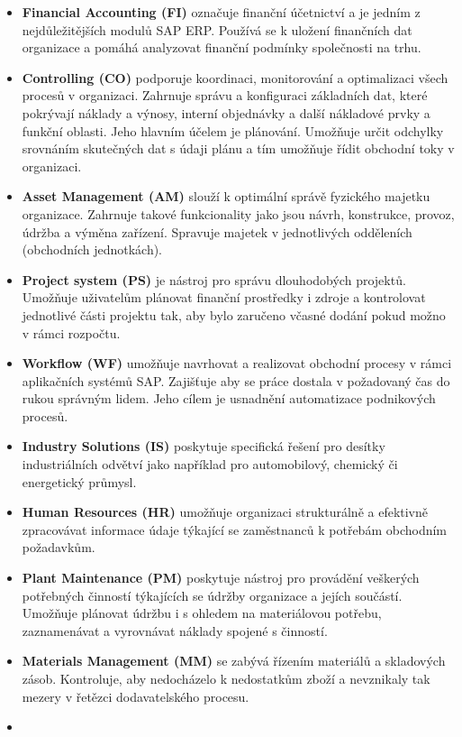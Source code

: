 \documentclass[thesis=M,czech]{FITthesis}[2012/06/26]
\begin{document}
\begin{itemize}
	\item
	\textbf{Financial Accounting (FI)} označuje finanční účetnictví a je jedním z nejdůležitějších modulů SAP ERP. Používá se k uložení finančních dat organizace a pomáhá analyzovat finanční podmínky společnosti na trhu.
	\item
	\textbf{Controlling (CO)} podporuje koordinaci, monitorování a optimalizaci všech procesů v organizaci. Zahrnuje správu a konfiguraci základních dat, které pokrývají náklady a výnosy, interní objednávky a další nákladové prvky a funkční oblasti. Jeho hlavním účelem je plánování. Umožňuje určit odchylky srovnáním skutečných dat s údaji plánu a tím umožňuje řídit obchodní toky v organizaci.
	\item
	\textbf{Asset Management (AM)} slouží k optimální správě fyzického majetku organizace. Zahrnuje takové funkcionality jako jsou návrh, konstrukce, provoz, údržba a výměna zařízení. Spravuje majetek v jednotlivých odděleních (obchodních jednotkách).
	\item
	\textbf{Project system (PS)} je nástroj pro správu dlouhodobých projektů. Umožňuje uživatelům plánovat finanční prostředky i zdroje a kontrolovat jednotlivé části projektu tak, aby bylo zaručeno včasné dodání pokud možno v rámci rozpočtu.
	\item
	\textbf{Workflow (WF)} umožňuje navrhovat a realizovat obchodní procesy v rámci aplikačních systémů SAP. Zajišťuje aby se práce dostala v požadovaný čas do rukou správným lidem. Jeho cílem je usnadnění automatizace podnikových procesů.
	\item
	\textbf{Industry Solutions (IS)} poskytuje specifická řešení pro desítky industriálních odvětví jako například pro automobilový, chemický či energetický průmysl.
	\item
	\textbf{Human Resources (HR)} umožňuje organizaci strukturálně a efektivně zpracovávat informace údaje týkající se zaměstnanců k potřebám obchodním požadavkům.
	\item
	\textbf{Plant Maintenance (PM)} poskytuje nástroj pro provádění veškerých potřebných činností týkajících se údržby organizace a jejích součástí. Umožňuje plánovat údržbu i s ohledem na materiálovou potřebu, zaznamenávat a vyrovnávat náklady spojené s činností.
	\item
	\textbf{Materials Management (MM)} se zabývá řízením materiálů a skladových zásob. Kontroluje, aby nedocházelo k nedostatkům zboží a nevznikaly tak mezery v řetězci dodavatelského procesu.
	\item

\end{itemize}
\end{document}
